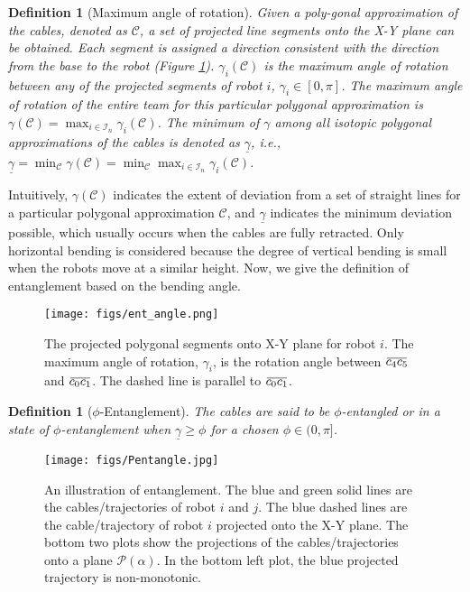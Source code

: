 \documentclass[conference]{IEEEtran}
\newtheorem{defn}[thm]{Definition}
\newcommand*{\myset}[1]{\mathcal{#1}} %
\newcommand*{\projang}{\alpha} %
\newcommand*{\projplane}{\myset{P}} %
\newcommand*{\entangle}{\gamma} %
\newcommand*{\entangledef}{\phi} %
\newcommand{\overbar}[1]{\mkern 1.5mu\overline{\mkern-1.5mu#1\mkern-1.5mu}\mkern 1.5mu}
\newcommand*{\polyapprox}{\myset{C}}
\begin{document}
\begin{defn}[Maximum angle of rotation]
    Given a poly-gonal approximation of the cables, denoted as $\polyapprox$, a set of projected line segments onto the X-Y plane can be obtained.
    Each segment is assigned a direction consistent with the direction from the base to the robot (Figure \ref{fig: ent_angle}).
    $\entangle_i(\polyapprox)$ is the maximum angle of rotation between any of the projected segments of robot $i$, $\gamma_i\in[0,\pi]$.
    The maximum angle of rotation of the entire team for this particular polygonal approximation is $\entangle(\polyapprox)=\max_{i\in\myset{I}_n}\entangle_i(\polyapprox)$.
    The minimum of $\entangle$ among all isotopic polygonal approximations of the cables is denoted as $\underline{\entangle}$, i.e., $\underline{\entangle}=\min_{\polyapprox}\entangle(\polyapprox)=\min_{\polyapprox}\max_{i\in\myset{I}_n}\entangle_i(\polyapprox)$.
\end{defn}

Intuitively, 
$\entangle(\polyapprox)$ indicates the extent of deviation from a set of straight lines for a particular polygonal approximation $\polyapprox$, 
and $\underline{\entangle}$ indicates the minimum deviation possible, which usually occurs when the cables are fully retracted.
Only horizontal bending is considered because the degree of vertical bending is small when the robots move at a similar height.
Now, we give the definition of entanglement based on the bending angle.
\begin{figure}[!t]
\centering
\texttt{[image: figs/ent\_angle.png]}
\caption{\footnotesize The projected polygonal segments onto X-Y plane for robot $i$. The maximum angle of rotation, $\entangle_i$, is the rotation angle between $\overbar{c_4c_5}$ and $\overbar{c_0c_1}$. The dashed line is parallel to $\overbar{c_0c_1}$.}
\label{fig: ent_angle}
\end{figure}
\begin{defn}[$\entangledef$-Entanglement]
The cables are said to be $\entangledef$-entangled or in a state of $\entangledef$-entanglement when $\underline{\entangle}\geq\entangledef$ for a chosen $\entangledef\in(0,\pi]$.
\end{defn}

\begin{figure}[!t]
\centering
\texttt{[image: figs/Pentangle.jpg]}
\caption{\footnotesize An illustration of entanglement. The blue and green solid lines are the cables/trajectories of robot $i$ and $j$. The blue dashed lines are the cable/trajectory of robot $i$ projected onto the X-Y plane. The bottom two plots show the projections of the cables/trajectories onto a plane $\projplane(\projang)$. In the bottom left plot, the blue projected trajectory is non-monotonic.}
\label{fig: entangle}
\end{figure}
\end{document}
